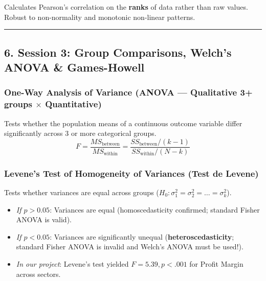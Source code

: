 \documentclass[
]{article}
\providecommand{\tightlist}{%
  \setlength{\itemsep}{0pt}\setlength{\parskip}{0pt}}
\begin{document}
Calculates Pearson's correlation on the \textbf{ranks} of data rather
than raw values. Robust to non-normality and monotonic non-linear
patterns.

\begin{center}\rule{0.5\linewidth}{0.5pt}\end{center}

\subsection{6. Session 3: Group Comparisons, Welch's ANOVA \&
Games-Howell}\label{session-3-group-comparisons-welchs-anova-games-howell}

\subsubsection{\texorpdfstring{One-Way Analysis of Variance (ANOVA ---
Qualitative 3+ groups \(\times\)
Quantitative)}{One-Way Analysis of Variance (ANOVA --- Qualitative 3+ groups \textbackslash times Quantitative)}}\label{one-way-analysis-of-variance-anova-qualitative-3-groups-times-quantitative}

Tests whether the population means of a continuous outcome variable
differ significantly across 3 or more categorical groups.
\[F = \frac{MS_{\text{between}}}{MS_{\text{within}}} = \frac{SS_{\text{between}} / (k - 1)}{SS_{\text{within}} / (N - k)}\]

\subsubsection{Levene's Test of Homogeneity of Variances (Test de
Levene)}\label{levenes-test-of-homogeneity-of-variances-test-de-levene}

Tests whether variances are equal across groups
(\(H_0: \sigma_1^2 = \sigma_2^2 = \dots = \sigma_k^2\)).

\begin{itemize}
\tightlist
\item
  \emph{If \(p > 0.05\)}: Variances are equal (homoscedasticity
  confirmed; standard Fisher ANOVA is valid).
\item
  \emph{If \(p < 0.05\)}: Variances are significantly unequal
  (\textbf{heteroscedasticity}; standard Fisher ANOVA is invalid and
  Welch's ANOVA must be used!).
\item
  \emph{In our project}: Levene's test yielded \(F = 5.39, p < .001\)
  for Profit Margin across sectors.
\end{itemize}
\end{document}
